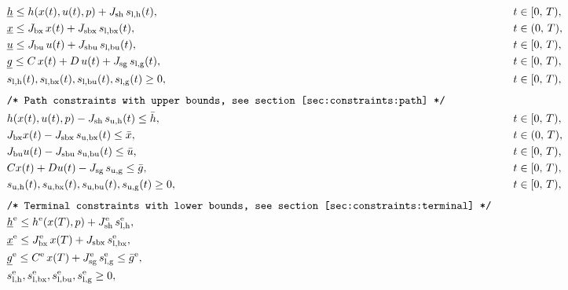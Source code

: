 \documentclass[english]{article}
\newcommand{\ind}[1]{_{\textrm{#1}}}
\newcommand{\terminal}{^{\textrm{e}}}
\newcommand{\lowerh}{\ind{l,h}}
\newcommand{\lowerbx}{\ind{l,bx}}
\newcommand{\lowerbu}{\ind{l,bu}}
\newcommand{\lowerg}{\ind{l,g}}
\newcommand{\upperh}{\ind{u,h}}
\newcommand{\upperbx}{\ind{u,bx}}
\newcommand{\upperbu}{\ind{u,bu}}
\newcommand{\upperg}{\ind{u,g}}
\newcommand{\mathComment}[1]{\texttt{/* #1 */}}
\begin{document}
\begin{align}
    &&&\underline{h} \leq h(x(t), u(t), p) + J_{\textrm{sh}} \, s\lowerh(t), &&\quad t \in [0,\,T),\label{eq:constraints:path:lower_bounds:start}\\
    &&&\underline{x} \leq J_{\textrm{bx}} \, x(t) + J_{\textrm{sbx}} \,s\lowerbx(t), &&\quad t \in (0,\,T),\\
    &&&\underline{u} \leq J_{\textrm{bu}} \,u(t) + J_{\textrm{sbu}} \,s\lowerbu(t), &&\quad t \in [0,\,T),\\
    &&&\underline{g} \leq C\,x(t) + D\,u(t) + J_{\textrm{sg}} \,s\lowerg(t), &&\quad t \in [0,\,T), \\
    &&& s\lowerh (t), s\lowerbx(t), s\lowerbu(t), s\lowerg(t) \geq 0, &&\quad t \in [0,\,T), \label{eq:constraints:path:lower_bounds:end}\\[1ex]
    &&&\mathComment{Path constraints with upper bounds, see section \ref{sec:constraints:path}}\nonumber\\
    &&& h(x(t), u(t), p) - J_{\textrm{sh}} \, s\upperh(t) \leq \bar{h}, &&\quad t \in [0,\,T),\label{eq:constraints:path:upper_bounds:start}\\
    &&& J_{\textrm{bx}} x(t) - J_{\textrm{sbx}}\, s\upperbx(t) \leq \bar{x}, &&\quad t \in (0,\,T),\\
    &&& J_{\textrm{bu}} u(t) - J_{\textrm{sbu}}\, s\upperbu(t)\leq \bar{u}, &&\quad t \in [0,\,T),\\
    &&&Cx(t) + Du(t) - J_{\textrm{sg}}\, s\upperg \leq \bar{g}, &&\quad t \in [0,\,T), \\
    &&& s\upperh(t), s\upperbx(t), s\upperbu(t), s\upperg(t) \geq 0, &&\quad t \in [0,\,T), \label{eq:constraints:path:upper_bounds:end}\\[1ex]
    &&&\mathComment{Terminal constraints with lower bounds, see section \ref{sec:constraints:terminal}}\nonumber\\
    &&&\underline{h}\terminal \leq h\terminal(x(T), p) + J\ind{sh}\terminal\, s\lowerh\terminal, &&\label{eq:constraints:terminal:lower_bounds:start}\\
    &&&\underline{x}\terminal \leq J_{\textrm{bx}}\terminal\, x(T) + J\ind{sbx}\, s\lowerbx\terminal, &&\\ %
    &&&\underline{g}\terminal \leq C\terminal\, x(T) + J\ind{sg}\terminal\, s\lowerg\terminal \leq \bar{g}\terminal, && \\
    &&& s\lowerh\terminal, s\lowerbx\terminal, s\lowerbu\terminal, s\lowerg\terminal \geq 0, \label{eq:constraints:terminal:lower_bounds:end}\\[1ex]

\end{align}
\end{document}
